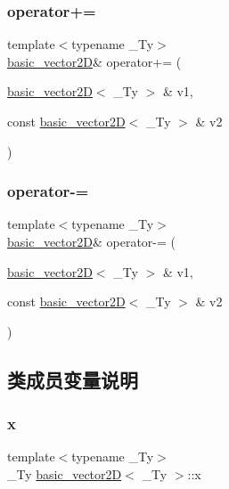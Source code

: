 \subsubsection{\texorpdfstring{operator+=}{operator+=}}
{\footnotesize\ttfamily template$<$typename \+\_\+\+Ty$>$ \\
\hyperlink{structbasic__vector2_d}{basic\+\_\+vector2D}\& operator+= (\begin{DoxyParamCaption}\item[{\hyperlink{structbasic__vector2_d}{basic\+\_\+vector2D}$<$ \+\_\+\+Ty $>$ \&}]{v1,  }\item[{const \hyperlink{structbasic__vector2_d}{basic\+\_\+vector2D}$<$ \+\_\+\+Ty $>$ \&}]{v2 }\end{DoxyParamCaption})\hspace{0.3cm}{\ttfamily [friend]}}

\mbox{\label{structbasic__vector2_d_a840973b019d576292fcfbb982e351314}} 
\subsubsection{\texorpdfstring{operator-\/=}{operator-=}}
{\footnotesize\ttfamily template$<$typename \+\_\+\+Ty$>$ \\
\hyperlink{structbasic__vector2_d}{basic\+\_\+vector2D}\& operator-\/= (\begin{DoxyParamCaption}\item[{\hyperlink{structbasic__vector2_d}{basic\+\_\+vector2D}$<$ \+\_\+\+Ty $>$ \&}]{v1,  }\item[{const \hyperlink{structbasic__vector2_d}{basic\+\_\+vector2D}$<$ \+\_\+\+Ty $>$ \&}]{v2 }\end{DoxyParamCaption})\hspace{0.3cm}{\ttfamily [friend]}}



\subsection{类成员变量说明}
\mbox{\label{structbasic__vector2_d_a9f606d50a5993d8c8f3834e67e2e750d}} 
\subsubsection{\texorpdfstring{x}{x}}
{\footnotesize\ttfamily template$<$typename \+\_\+\+Ty$>$ \\
\+\_\+\+Ty \hyperlink{structbasic__vector2_d}{basic\+\_\+vector2D}$<$ \+\_\+\+Ty $>$\+::x}

